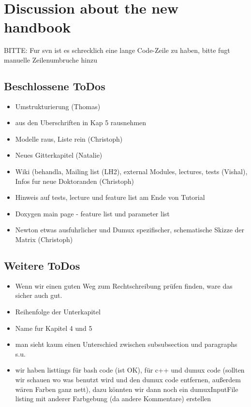 \chapter{Discussion about the new handbook}

BITTE: Fur svn ist es schrecklich eine lange Code-Zeile zu haben, bitte fugt
manuelle Zeilenumbruche hinzu
\section{Beschlossene ToDos}
\begin{itemize}
  \item Umstrukturierung (Thomas)
  \item \Dumux aus den Uberschriften in Kap 5 rausnehmen
  \item Modelle raus, Liste rein (Christoph)
  \item Neues Gitterkapitel (Natalie)
  \item Wiki (behandla, Mailing list (LH2), external Modules, lectures, tests
        (Vishal), Infos fur neue Doktoranden (Christoph)
  \item Hinweis auf tests, lecture und feature list am Ende von Tutorial
  \item Doxygen main page - feature list und parameter list
  \item Newton etwas ausfuhrlicher und Dumux spezifischer, schematische
        Skizze der Matrix (Christoph)
\end{itemize}

\section{Weitere ToDos}
\begin{itemize}
  \item Wenn wir einen guten Weg zum Rechtschreibung prüfen finden, ware das sicher
        auch gut.
  \item Reihenfolge der Unterkapitel
  \item Name fur Kapitel 4 und 5
  \item man sieht kaum einen Unterschied zwischen subsubsection und paragraphs s.u.
  \item wir haben listtings für bash code (ist OK), für c++ und dumux code (sollten
        wir schauen wo was benutzt wird und den dumux code entfernen, außerdem wären
        Farben ganz nett), dazu könnten wir dann noch ein dumuxInputFile listing
        mit anderer Farbgebung (da andere Kommentare) erstellen
\end{itemize}

